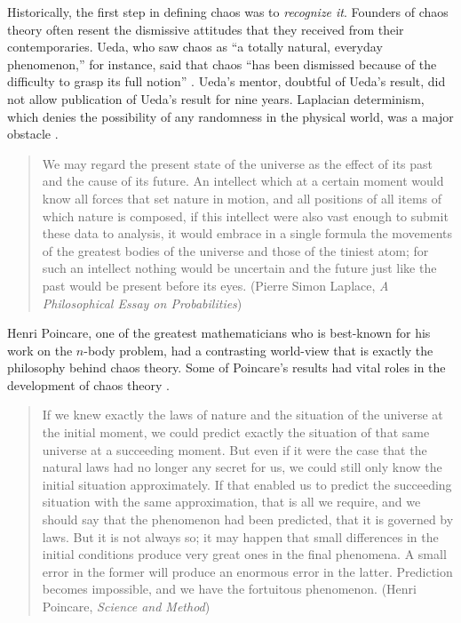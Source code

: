 \documentclass[10pt,twoside]{book}
\begin{document}
Historically, the first step in defining chaos was to \textit{recognize it}.
Founders of chaos theory often resent the dismissive attitudes that they received from their contemporaries.
Ueda, who saw chaos as ``a totally natural, everyday phenomenon,'' for instance, said that chaos ``has been dismissed because of the difficulty to grasp its full notion'' \citep[p.533]{gleick}.
Ueda's mentor, doubtful of Ueda's result, did not allow publication of Ueda's result for nine years.
Laplacian determinism, which denies the possibility of any randomness in the physical world, was a major obstacle \citep{stone}.
\begin{quotation}
  We may regard the present state of the universe as the effect of its past and the cause of its future. An intellect which at a certain moment would know all forces that set nature in motion, and all positions of all items of which nature is composed, if this intellect were also vast enough to submit these data to analysis, it would embrace in a single formula the movements of the greatest bodies of the universe and those of the tiniest atom; for such an intellect nothing would be uncertain and the future just like the past would be present before its eyes.
  (Pierre Simon Laplace, \textit{A Philosophical Essay on Probabilities})
\end{quotation}
Henri Poincare, one of the greatest mathematicians who is best-known for his work on the $n$-body problem, had a contrasting world-view that is exactly the philosophy behind chaos theory.
Some of Poincare's results had vital roles in the development of chaos theory \citep[p.202]{ueda-abraham}.
\begin{quotation}
  If we knew exactly the laws of nature and the situation of the universe at the initial moment, we could predict exactly the situation of that same universe at a succeeding moment. But even if it were the case that the natural laws had no longer any secret for us, we could still only know the initial situation approximately. If that enabled us to predict the succeeding situation with the same approximation, that is all we require, and we should say that the phenomenon had been predicted, that it is governed by laws. But it is not always so; it may happen that small differences in the initial conditions produce very great ones in the final phenomena. A small error in the former will produce an enormous error in the latter. Prediction becomes impossible, and we have the fortuitous phenomenon.
  (Henri Poincare, \textit{Science and Method})
\end{quotation}
\end{document}
